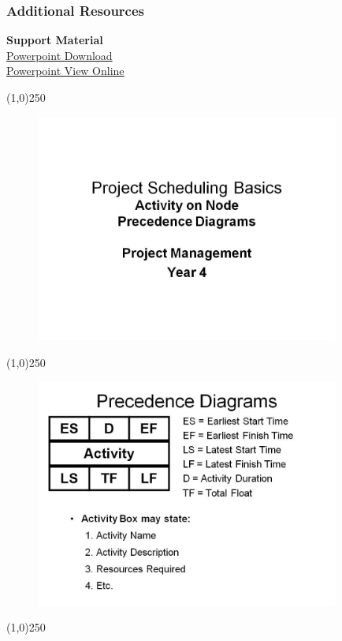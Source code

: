 \begin{frame}
\frametitle{Additional Resources}
\textbf{Support Material}\\
\href{https://sites.google.com/site/paulveseyresourcefiles/project-management/Lecture\%2011\%20-\%20Project\%20Time\%20Management\%20AON\%204-8.pptx?attredirects=0&d=1}{Powerpoint Download}\\
\href{https://docs.google.com/viewer?a=v&pid=sites&srcid=ZGVmYXVsdGRvbWFpbnxwYXVsdmVzZXlyZXNvdXJjZWZpbGVzfGd4OjNlMzYwYmNkOWEyNzhhOTM}{Powerpoint View Online}\\
\end{frame}
\begin{center}\line(1,0){250}\end{center}



\begin{frame}
\begin{figure}
	\centering
		\includegraphics[width = 10.0cm]{oldnotes/Slide124.jpg}
\end{figure}
\end{frame}
\begin{center}\line(1,0){250}\end{center}


\begin{frame}
\begin{figure}
	\centering
		\includegraphics[width = 10.0cm]{oldnotes/Slide125.jpg}
\end{figure}
\end{frame}
\begin{center}\line(1,0){250}\end{center}


